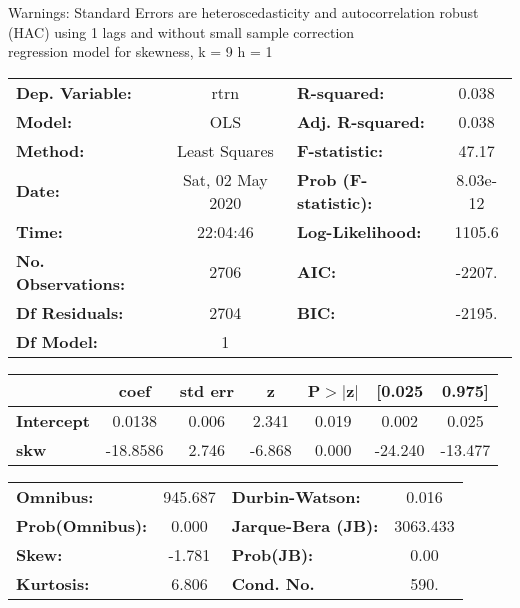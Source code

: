 Warnings: \newline
 [1] Standard Errors are heteroscedasticity and autocorrelation robust (HAC) using 1 lags and without small sample correction\\ 

regression model for skewness, k = 9 h = 1\begin{center}
\begin{tabular}{lclc}
\toprule
\textbf{Dep. Variable:}    &       rtrn       & \textbf{  R-squared:         } &     0.038   \\
\textbf{Model:}            &       OLS        & \textbf{  Adj. R-squared:    } &     0.038   \\
\textbf{Method:}           &  Least Squares   & \textbf{  F-statistic:       } &     47.17   \\
\textbf{Date:}             & Sat, 02 May 2020 & \textbf{  Prob (F-statistic):} &  8.03e-12   \\
\textbf{Time:}             &     22:04:46     & \textbf{  Log-Likelihood:    } &    1105.6   \\
\textbf{No. Observations:} &        2706      & \textbf{  AIC:               } &    -2207.   \\
\textbf{Df Residuals:}     &        2704      & \textbf{  BIC:               } &    -2195.   \\
\textbf{Df Model:}         &           1      & \textbf{                     } &             \\
\bottomrule
\end{tabular}
\begin{tabular}{lcccccc}
                   & \textbf{coef} & \textbf{std err} & \textbf{z} & \textbf{P$> |$z$|$} & \textbf{[0.025} & \textbf{0.975]}  \\
\midrule
\textbf{Intercept} &       0.0138  &        0.006     &     2.341  &         0.019        &        0.002    &        0.025     \\
\textbf{skw}       &     -18.8586  &        2.746     &    -6.868  &         0.000        &      -24.240    &      -13.477     \\
\bottomrule
\end{tabular}
\begin{tabular}{lclc}
\textbf{Omnibus:}       & 945.687 & \textbf{  Durbin-Watson:     } &    0.016  \\
\textbf{Prob(Omnibus):} &   0.000 & \textbf{  Jarque-Bera (JB):  } & 3063.433  \\
\textbf{Skew:}          &  -1.781 & \textbf{  Prob(JB):          } &     0.00  \\
\textbf{Kurtosis:}      &   6.806 & \textbf{  Cond. No.          } &     590.  \\
\bottomrule
\end{tabular}
\end{center}

